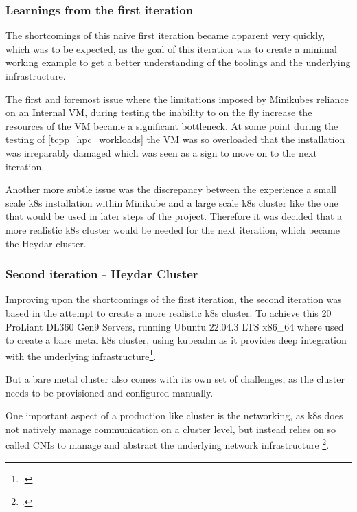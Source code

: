 \subsubsection*{Learnings from the first iteration}

The shortcomings of this naive first iteration became apparent very quickly, 
which was to be expected, as the goal of this iteration was to create a minimal working example to get a better understanding of the toolings and the underlying infrastructure.

The first and foremost issue where the limitations imposed by Minikubes reliance on an Internal \ac{VM},
during testing the inability to on the fly increase the resources of the \ac{VM} became a significant bottleneck.
At some point during the testing of \ref{tcpp_hpc_workloads} the \ac{VM} was so overloaded that the installation was irreparably damaged which was seen as a sign to move on to the next iteration.

Another more subtle issue was the discrepancy between the experience a small scale \ac{k8s} installation within Minikube and a large scale \ac{k8s} cluster like the one that would be used in later steps of the project.
Therefore it was decided that a more realistic \ac{k8s} cluster would be needed for the next iteration, which became the Heydar cluster.

\subsubsection{Second iteration - Heydar Cluster}
\label{heydar_cluster}

Improving upon the shortcomings of the first iteration, the second iteration was based in the attempt to create a more realistic \ac{k8s} cluster.
To achieve this 20 ProLiant DL360 Gen9 Servers, running Ubuntu 22.04.3 LTS x86\_64 where used to create a bare metal \ac{k8s} cluster,
using kubeadm as it provides deep integration with the underlying infrastructure\footcite{CreatingClusterKubeadm}.

But a bare metal cluster also comes with its own set of challenges, as the cluster needs to be provisioned and configured manually.


One important aspect of a production like cluster is the networking, as \ac{k8s} does not natively manage communication on a cluster level,
but instead relies on so called \ac{CNI}s to manage and abstract the underlying network infrastructure \footcite{ClusterNetworking}.

